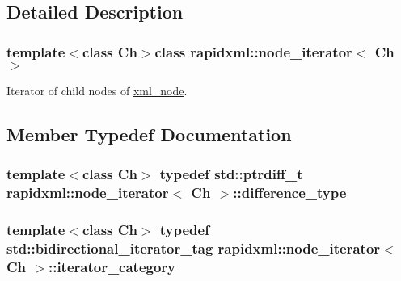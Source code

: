 \subsection{Detailed Description}
\subsubsection*{template$<$class Ch$>$class rapidxml\+::node\+\_\+iterator$<$ Ch $>$}

Iterator of child nodes of \hyperlink{classrapidxml_1_1xml__node}{xml\+\_\+node}. 

\subsection{Member Typedef Documentation}
\hypertarget{classrapidxml_1_1node__iterator_a5bdc462b980a52c5fa2d99ac9f4f4bff}{}
\subsubsection[{difference\+\_\+type}]{\setlength{\rightskip}{0pt plus 5cm}template$<$class Ch$>$ typedef std\+::ptrdiff\+\_\+t {\bf rapidxml\+::node\+\_\+iterator}$<$ Ch $>$\+::{\bf difference\+\_\+type}}\label{classrapidxml_1_1node__iterator_a5bdc462b980a52c5fa2d99ac9f4f4bff}
\hypertarget{classrapidxml_1_1node__iterator_a8e82d75f768e17bf7349d010ee26c037}{}
\subsubsection[{iterator\+\_\+category}]{\setlength{\rightskip}{0pt plus 5cm}template$<$class Ch$>$ typedef std\+::bidirectional\+\_\+iterator\+\_\+tag {\bf rapidxml\+::node\+\_\+iterator}$<$ Ch $>$\+::{\bf iterator\+\_\+category}}\label{classrapidxml_1_1node__iterator_a8e82d75f768e17bf7349d010ee26c037}
\hypertarget{classrapidxml_1_1node__iterator_a65dca8bca2b9c29f635b9ad0bdeeecb9}{}
